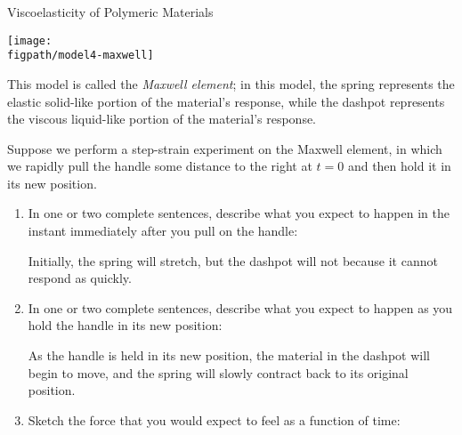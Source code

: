 \begin{activity}{Viscoelasticity of Polymeric Materials}
\begin{model}
	\vspace{3pt}
	\centerline{\texttt{[image: \\figpath/model4-maxwell]}}
	
	This model is called the \emph{Maxwell element}; in this model, the spring represents the elastic solid-like portion of the material's response, while the dashpot represents the viscous liquid-like portion of the material's response.
	
\end{model}

	
\begin{ctqs}
	\question Suppose we perform a step-strain experiment on the Maxwell element, in which we rapidly pull the handle some distance to the right at $t=0$ and then hold it in its new position.
	
		\begin{enumerate}
			\item In one or two complete sentences, describe what you expect to happen in the instant immediately after you pull on the handle:
			
				\begin{solution}[1.75in]
					Initially, the spring will stretch, but the dashpot will not because it cannot respond as quickly.
				\end{solution}
			
			\item In one or two complete sentences, describe what you expect to happen as you hold the handle in its new position:
			
				\begin{solution}[1.75in]
					As the handle is held in its new position, the material in the dashpot will begin to move, and the spring will slowly contract back to its original position.
				\end{solution}
			
			\item Sketch the force that you would expect to feel as a function of time: \label{\labelbase:ctq:maxwellstepstrain}
			
				\begin{solution}[1.75in]
				\end{solution}
		\end{enumerate}
					

\end{ctqs}
\end{activity}
